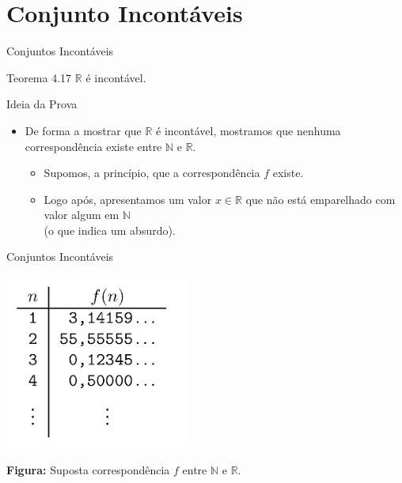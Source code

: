 \documentclass[xcolor=dvipsnames,table]{beamer}
\begin{document}
	\section{Conjunto Incontáveis}

	\begin{frame}{Conjuntos Incontáveis}
		\begin{block}{Teorema 4.17}
			$\mathbb{R}$ é incontável.
		\end{block} \pause
		\begin{block}{Ideia da Prova}
			\begin{itemize}
				\item De forma a mostrar que $\mathbb{R}$ é incontável, mostramos que nenhuma correspondência existe entre $\mathbb{N}$ e $\mathbb{R}$.
				\begin{itemize}
					\item Supomos, a princípio, que a correspondência $f$ existe.
					\item Logo após, apresentamos um valor $x \in \mathbb{R}$ que não está emparelhado com valor algum em $\mathbb{N}$ \\(o que indica um absurdo).				
				\end{itemize}
			\end{itemize}
		\end{block}
	\end{frame}
	
	\begin{frame}{Conjuntos Incontáveis}
		\begin{center}
			\includegraphics[width=6cm]{images/fHip.png}
			
			{\bf Figura:} Suposta correspondência $f$ entre $\mathbb{N}$ e $\mathbb{R}$.
		\end{center}
	\end{frame}
	
\end{document}
